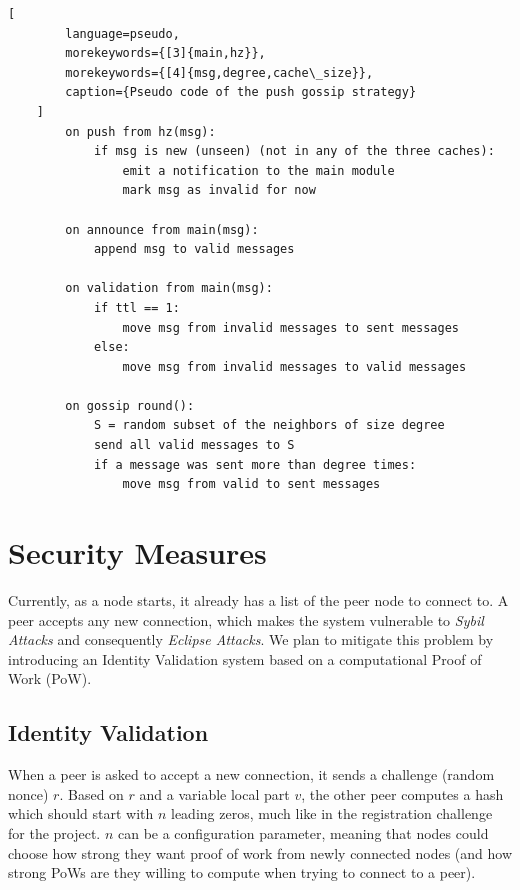 \documentclass[a4paper,english,10pt,NET]{tumarticle}
\begin{document}
\begin{minipage}{0.50\linewidth}
	\begin{lstlisting}[
		language=pseudo,
		morekeywords={[3]{main,hz}},
		morekeywords={[4]{msg,degree,cache\_size}},
		caption={Pseudo code of the push gossip strategy}
	]
		on push from hz(msg):
			if msg is new (unseen) (not in any of the three caches):
				emit a notification to the main module
				mark msg as invalid for now

		on announce from main(msg):
			append msg to valid messages

		on validation from main(msg):
			if ttl == 1:
				move msg from invalid messages to sent messages
			else:
				move msg from invalid messages to valid messages

		on gossip round():
			S = random subset of the neighbors of size degree
			send all valid messages to S
			if a message was sent more than degree times:
				move msg from valid to sent messages
	\end{lstlisting}
\end{minipage}

\section{Security Measures} \label{sec:security}

Currently, as a node starts, it already has a list of the peer node to connect to. A peer accepts any new connection, which makes the system vulnerable to \textit{Sybil Attacks} and consequently \textit{Eclipse Attacks}. We plan to mitigate this problem by introducing an Identity Validation system based on a computational Proof of Work (PoW).

\subsection{Identity Validation}

When a peer is asked to accept a new connection, it sends a challenge (random nonce) $r$. Based on $r$ and a variable local part $v$, the other peer computes a hash which should start with $n$ leading zeros, much like in the registration challenge for the project. $n$ can be a configuration parameter, meaning that nodes could choose how strong they want proof of work from newly connected nodes (and how strong PoWs are they willing to compute when trying to connect to a peer).
\end{document}
